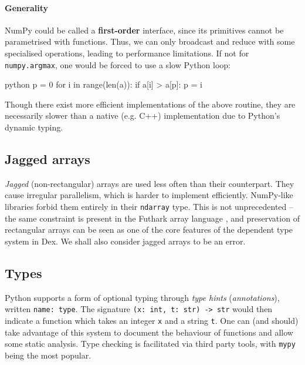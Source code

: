 \paragraph{Generality} NumPy could be called a \textbf{first-order} interface, since its primitives cannot be parametrised with functions. Thus, we can only broadcast and reduce with some specialised operations, leading to performance limitations. If not for \texttt{numpy.argmax}, one would be forced to use a slow Python loop:
\begin{center}
\begin{cminted}{python}
p = 0
for i in range(len(a)): 
    if a[i] > a[p]: p = i
\end{cminted}
\end{center}
Though there exist more efficient implementations of the above routine, they are necessarily slower than a native (e.g. C++) implementation due to Python's dynamic typing.

\subsection{Jagged arrays}

\textit{Jagged} (non-rectangular) arrays are used less often than their counterpart. 
They cause irregular parallelism, which is harder to implement efficiently. 
NumPy-like libraries forbid them entirely in their \texttt{ndarray} type. This is not unprecedented -- the same constraint is present in the Futhark array language \cite{henriksen2017futhark}, and preservation of rectangular arrays can be seen as one of the core features of the dependent type system in Dex. We shall also consider jagged arrays to be an error.

\subsection{Types}

Python supports a form of optional typing through \textit{type hints} (\textit{annotations}), written \texttt{name: type}. The signature \texttt{(x: int, t: str) -> str} would then indicate a function which takes an integer \texttt{x} and a string \texttt{t}.
One can (and should) take advantage of this system to document the behaviour of functions and allow some static analysis. Type checking is facilitated via third party tools, with \texttt{mypy} being the most popular.

